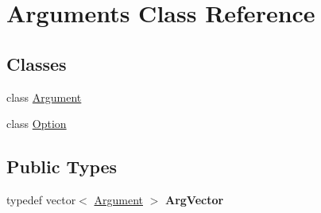 \hypertarget{classArguments}{}\section{Arguments Class Reference}
\label{classArguments}
\subsection*{Classes}
\begin{DoxyCompactItemize}
\item 
class \hyperlink{classArguments_1_1Argument}{Argument}
\item 
class \hyperlink{classArguments_1_1Option}{Option}
\end{DoxyCompactItemize}
\subsection*{Public Types}
\begin{DoxyCompactItemize}
\item 
\mbox{\label{classArguments_aa5f22bb8f6ba388f0828ea60a6d8e19f}} 
typedef vector$<$ \hyperlink{classArguments_1_1Argument}{Argument} $>$ {\bfseries Arg\+Vector}
\end{DoxyCompactItemize}
